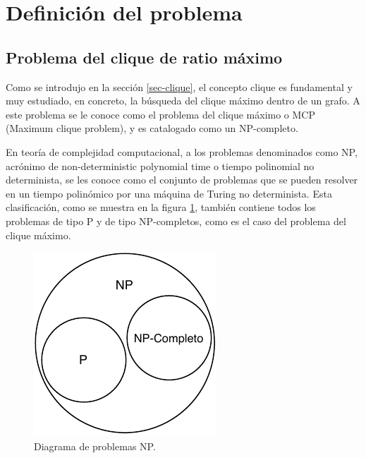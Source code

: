 \section{Definición del problema}

\subsection{Problema del clique de ratio máximo}
\label{intro-problema}
Como se introdujo en la sección \ref{sec-clique}, el concepto clique es fundamental y muy estudiado, en concreto, la búsqueda del clique máximo dentro de un grafo. A este problema se le conoce como el problema del clique máximo o \gls{MCP} (Maximum clique problem), y es catalogado como un NP-completo.

En teoría de complejidad computacional, a los problemas denominados como NP, acrónimo de non-deterministic polynomial time o tiempo polinomial no determinista, se les conoce como el conjunto de problemas que se pueden resolver en un tiempo polinómico por una máquina de Turing no determinista. Esta clasificación, como se muestra en la figura \ref{fig:problemas-np}, también contiene todos los problemas de tipo P y de tipo NP-completos, como es el caso del problema del clique máximo.

\begin{figure}[H]
	\centering
	\includegraphics{Figures/problemas-np.pdf}
	\caption{Diagrama de problemas NP.}
	\label{fig:problemas-np}
\end{figure}

